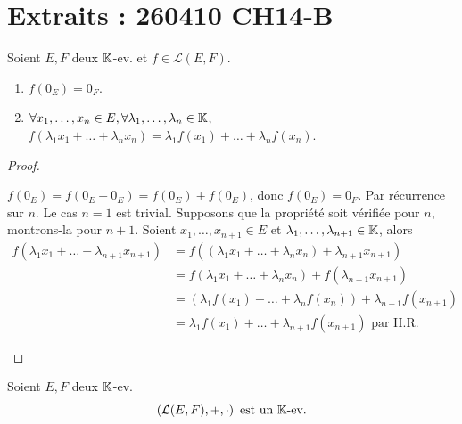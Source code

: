 \documentclass[12pt,a4paper]{report}
\begin{document}
\vspace{1em}


\section*{Extraits : 260410 CH14-B}


\begin{property}
    Soient $E,F$ deux $\mathbb{K}$-ev. et $f \in \mathcal L(E,F)$.
    \begin{enumerate}
        \item $f(0_E) = 0_F$.
        \item $\forall x_1,\dots,x_n\in E, \forall \lambda_1,\dots,\lambda_n\in\mathbb{K}$, $f(\lambda_1 x_1 + \dots + \lambda_n x_n) = \lambda_1 f(x_1) + \dots + \lambda_n f(x_n)$.
    \end{enumerate}
\end{property}

\begin{proof}
    \begin{outline}[enumerate]
        \1 $f(0_E) = f(0_E + 0_E) = f(0_E) + f(0_E)$, donc $f(0_E) = 0_F$.
        \1 Par récurrence sur $n$. Le cas $n=1$ est trivial. Supposons que la propriété soit vérifiée pour $n$, montrons-la pour $n+1$. Soient $x_1,\dots,x_{n+1}\in E$ et $\lambda_1,\dots,\lambda_{n+1}\in\mathbb{K}$, alors
        \begin{align*}
            f(\lambda_1 x_1 + \dots + \lambda_{n+1} x_{n+1}) &= f((\lambda_1 x_1 + \dots + \lambda_n x_n) + \lambda_{n+1} x_{n+1})\\
            &= f(\lambda_1 x_1 + \dots + \lambda_n x_n) + f(\lambda_{n+1} x_{n+1})\\
            &= (\lambda_1 f(x_1) + \dots + \lambda_n f(x_n)) + \lambda_{n+1} f(x_{n+1})\\
            &= \lambda_1 f(x_1) + \dots + \lambda_{n+1} f(x_{n+1}) \text{ par H.R.}
        \end{align*}
    \end{outline}
\end{proof}

\begin{property}
    Soient $E,F$ deux $\mathbb{K}$-ev.
    $$\left(\mathcal L(E,F), +, \cdot\right) \text{ est un } \mathbb{K}\text{-ev.}$$
\end{property}
\end{document}
